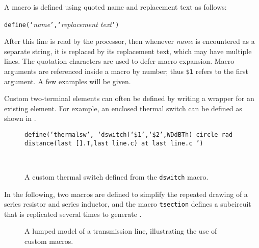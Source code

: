 A macro is defined using quoted name and replacement text as follows:

{\tt define(`}{\sl name}{\tt',`}{\sl replacement text}{\tt ')}

After this line is read by the \Mfour processor, then whenever {\sl name}
is encountered as a separate string, it is replaced by its replacement
text, which may have multiple lines.  The quotation characters are used
to defer macro expansion.  Macro arguments are referenced inside a
macro by number; thus {\tt \$1} refers to the first argument.
A few examples will be given.

Custom two-terminal elements can often be defined by writing a wrapper
for an existing element.  For example, an enclosed thermal switch
can be defined as shown in .
\begin{figure}[ht]
   \parbox{5in}{\tt define(`thermalsw',\hfill\break
   \hbox{}\space`dswitch(`\$1',`\$2',WDdBTh)\hfill\break
   \hbox{}\space\space circle rad distance(last [].T,last line.c)
     at last line.c ') }%
   \hfill\raise-0.15in\hbox{ }
   \caption{A custom thermal switch defined from the {\tt dswitch} macro.}
   \label{Thermal}
   \end{figure}

In the following,
two macros are defined to simplify the repeated drawing
of a series resistor and series inductor, and the macro {\tt tsection} defines
a subcircuit that is replicated several times to generate .
\pagebreak
{\small }
\begin{figure}[h!t]
   
   \caption{A lumped model of a transmission line, illustrating the
    use of custom macros.}
   \label{Tline}
   \end{figure}

